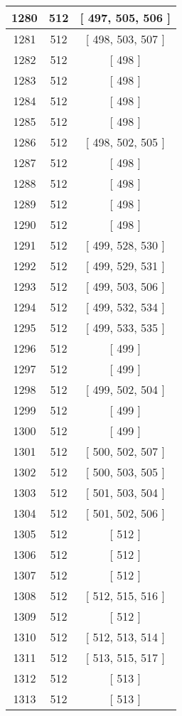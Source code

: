 \begin{center}
\begin{longtable}[H]{|| c c c ||}
1280 & 512 & [ 497, 505, 506 ] \\ 
\hline
1281 & 512 & [ 498, 503, 507 ] \\ 
\hline
1282 & 512 & [ 498 ] \\ 
\hline
1283 & 512 & [ 498 ] \\ 
\hline
1284 & 512 & [ 498 ] \\ 
\hline
1285 & 512 & [ 498 ] \\ 
\hline
1286 & 512 & [ 498, 502, 505 ] \\ 
\hline
1287 & 512 & [ 498 ] \\ 
\hline
1288 & 512 & [ 498 ] \\ 
\hline
1289 & 512 & [ 498 ] \\ 
\hline
1290 & 512 & [ 498 ] \\ 
\hline
1291 & 512 & [ 499, 528, 530 ] \\ 
\hline
1292 & 512 & [ 499, 529, 531 ] \\ 
\hline
1293 & 512 & [ 499, 503, 506 ] \\ 
\hline
1294 & 512 & [ 499, 532, 534 ] \\ 
\hline
1295 & 512 & [ 499, 533, 535 ] \\ 
\hline
1296 & 512 & [ 499 ] \\ 
\hline
1297 & 512 & [ 499 ] \\ 
\hline
1298 & 512 & [ 499, 502, 504 ] \\ 
\hline
1299 & 512 & [ 499 ] \\ 
\hline
1300 & 512 & [ 499 ] \\ 
\hline
1301 & 512 & [ 500, 502, 507 ] \\ 
\hline
1302 & 512 & [ 500, 503, 505 ] \\ 
\hline
1303 & 512 & [ 501, 503, 504 ] \\ 
\hline
1304 & 512 & [ 501, 502, 506 ] \\ 
\hline
1305 & 512 & [ 512 ] \\ 
\hline
1306 & 512 & [ 512 ] \\ 
\hline
1307 & 512 & [ 512 ] \\ 
\hline
1308 & 512 & [ 512, 515, 516 ] \\ 
\hline
1309 & 512 & [ 512 ] \\ 
\hline
1310 & 512 & [ 512, 513, 514 ] \\ 
\hline
1311 & 512 & [ 513, 515, 517 ] \\ 
\hline
1312 & 512 & [ 513 ] \\ 
\hline
1313 & 512 & [ 513 ] \\ 

\end{longtable}
\end{center}
